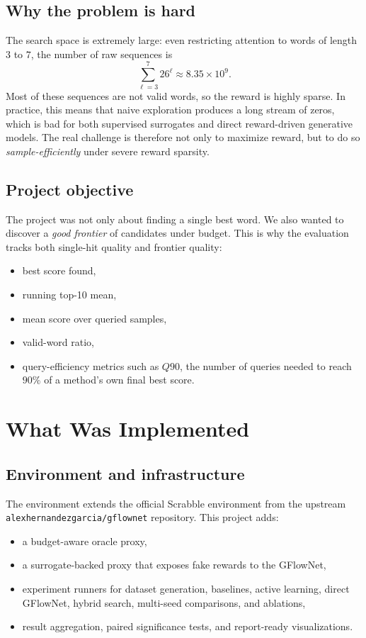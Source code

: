 \documentclass[10pt]{article}
\begin{document}
\subsection{Why the problem is hard}
The search space is extremely large: even restricting attention to words of length \(3\) to \(7\), the number of raw sequences is
\[
\sum_{\ell=3}^{7} 26^\ell \approx 8.35 \times 10^9.
\]
Most of these sequences are not valid words, so the reward is highly sparse. In practice, this means that naive exploration produces a long stream of zeros, which is bad for both supervised surrogates and direct reward-driven generative models. The real challenge is therefore not only to maximize reward, but to do so \emph{sample-efficiently} under severe reward sparsity.

\subsection{Project objective}
The project was not only about finding a single best word. We also wanted to discover a \emph{good frontier} of candidates under budget. This is why the evaluation tracks both single-hit quality and frontier quality:
\begin{itemize}
    \item best score found,
    \item running top-10 mean,
    \item mean score over queried samples,
    \item valid-word ratio,
    \item query-efficiency metrics such as \(Q90\), the number of queries needed to reach \(90\%\) of a method's own final best score.
\end{itemize}

\section{What Was Implemented}
\subsection{Environment and infrastructure}
The environment extends the official Scrabble environment from the upstream \texttt{alexhernandezgarcia/gflownet} repository. This project adds:
\begin{itemize}
    \item a budget-aware oracle proxy,
    \item a surrogate-backed proxy that exposes fake rewards to the GFlowNet,
    \item experiment runners for dataset generation, baselines, active learning, direct GFlowNet, hybrid search, multi-seed comparisons, and ablations,
    \item result aggregation, paired significance tests, and report-ready visualizations.
\end{itemize}
\end{document}
